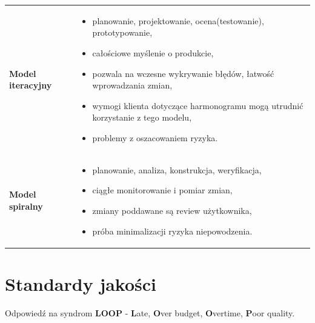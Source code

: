 \documentclass[a4paper]{article}
\begin{document}
\begin{table}[H]
\begin{center}
\begin{tabular}{ p{5cm} p{8cm}  }
                \cmidrule(r){1-1}\cmidrule(l){2-2}

                \textbf{Model iteracyjny}
                &
                \begin{itemize}
                    \item planowanie, projektowanie, ocena(testowanie), prototypowanie,
                    \item całościowe myślenie o produkcie,
                    \item pozwala na wczesne wykrywanie błędów, łatwość wprowadzania zmian,
                    \item wymogi klienta dotyczące harmonogramu mogą utrudnić korzystanie z tego
                    modelu,
                    \item problemy z oszacowaniem ryzyka.
                \end{itemize}
                \\

                \cmidrule(r){1-1}\cmidrule(l){2-2}

                \textbf{Model spiralny}
                &
                \begin{itemize}
                    \item planowanie, analiza, konstrukcja, weryfikacja,
                    \item ciągłe monitorowanie i pomiar zmian,
                    \item zmiany poddawane są review użytkownika,
                    \item próba minimalizacji ryzyka niepowodzenia.
                \end{itemize}
                \\

            \end{tabular}
        \end{center}
    \end{table}

    \section{Standardy jakości}

    Odpowiedź na syndrom \textbf{LOOP} - \textbf{L}ate, \textbf{O}ver budget, \textbf{O}vertime, \textbf{P}oor quality.
\end{document}
